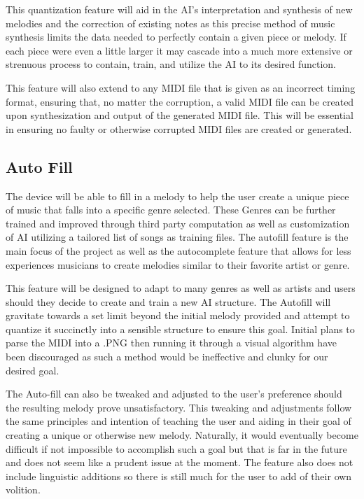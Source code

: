 This quantization feature will aid in the AI's interpretation and synthesis of new
melodies and the correction of existing notes as this precise method of music synthesis
limits the data needed to perfectly contain a given piece or melody. If each piece were
even a little larger it may cascade into a much more extensive or strenuous process to
contain, train, and utilize the AI to its desired function.

This feature will also extend to any MIDI file that is given as an incorrect timing
format, ensuring that, no matter the corruption, a valid MIDI file can be created upon
synthesization and output of the generated MIDI file. This will be essential in ensuring
no faulty or otherwise corrupted MIDI files are created or generated.

\subsection{Auto Fill}

The device will be able to fill in a melody to help the user create a unique piece of
music that falls into a specific genre selected. These Genres can be further trained and
improved through third party computation as well as customization of AI utilizing a
tailored list of songs as training files. The autofill feature is the main focus of the
project as well as the autocomplete feature that allows for less experiences musicians to
create melodies similar to their favorite artist or genre.

This feature will be designed to adapt to many genres as well as artists and users should
they decide to create and train a new AI structure. The Autofill will gravitate towards a
set limit beyond the initial melody provided and attempt to quantize it succinctly into a
sensible structure to ensure this goal. Initial plans to parse the MIDI into a .PNG then
running it through a visual algorithm have been discouraged as such a method would be
ineffective and clunky for our desired goal.

The Auto-fill can also be tweaked and adjusted to the user's preference should the
resulting melody prove unsatisfactory. This tweaking and adjustments follow the same
principles and intention of teaching the user and aiding in their goal of creating a
unique or otherwise new melody. Naturally, it would eventually become difficult if not
impossible to accomplish such a goal but that is far in the future and does not seem like
a prudent issue at the moment. The feature also does not include linguistic additions so
there is still much for the user to add of their own volition.

